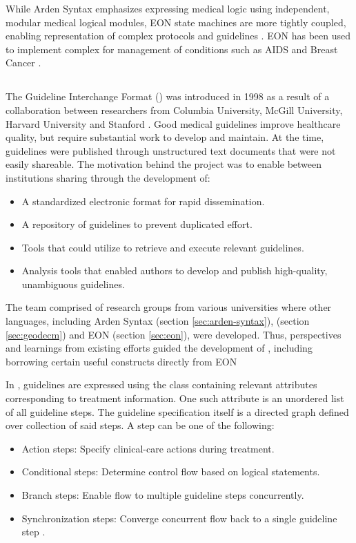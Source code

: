 While Arden Syntax emphasizes expressing medical logic using independent, modular
medical logical modules, EON state machines are more tightly coupled, enabling
representation of complex protocols and guidelines \cite{TuAMIA96}. EON has
been used to implement complex \CDSSs{} for management of conditions such as
AIDS \cite{MusenJAMIA96} and Breast Cancer \cite{TuAMIA96}.

\subsection{\GLIF{}}\label{sec:glif}

The Guideline Interchange Format (\GLIF{}) was introduced in 1998 as a
result of a collaboration between researchers from Columbia University,
McGill University, Harvard University and Stanford \cite{ClerqAIM03}. Good medical
guidelines improve healthcare quality, but require substantial work
to develop and maintain. At the time, guidelines were published through
unstructured text documents that were not easily shareable. The motivation
behind the \GLIF{} project was to enable \BPG{} between institutions sharing
through the development of:
\begin{itemize}
  \item A standardized electronic format for rapid dissemination.
  \item A repository of guidelines to prevent duplicated effort.
  \item Tools that \HCPs{} could utilize to retrieve and
    execute relevant guidelines.
  \item Analysis tools that enabled authors to develop
    and publish high-quality, unambiguous guidelines.
\end{itemize}

The \GLIF{} team comprised of research groups from various universities
where other languages, including Arden Syntax (section \ref{sec:arden-syntax}),
\GEODECM{} (section \ref{sec:geodecm}) and EON (section \ref{sec:eon}),
were developed. Thus, perspectives and learnings from existing efforts guided
the development of \GLIF{}, including borrowing certain useful constructs
directly from EON \cite{MachadoJAMIA98}

In \GLIF{}, guidelines are expressed using the \GLIF{} class containing
relevant attributes corresponding to treatment information. One such
attribute is an unordered list of all guideline steps. The guideline
specification itself is a directed graph defined over collection of
said steps. A step can be one of the following:
\begin{itemize}
    \item Action steps: Specify clinical-care actions during treatment.
    \item Conditional steps: Determine control flow based on logical statements.
    \item Branch steps: Enable flow to multiple guideline steps concurrently.
    \item Synchronization steps: Converge concurrent flow back to a single
      guideline step \cite{MachadoJAMIA98}.
\end{itemize}

